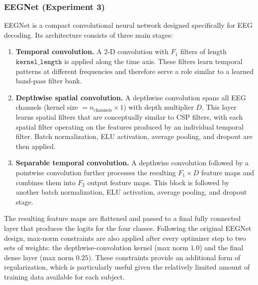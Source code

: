 \documentclass[11pt,a4paper]{article}
\begin{document}
\subsubsection{EEGNet (Experiment 3)}
\label{sec:eegnet}

EEGNet \cite{lawhern2018eegnet} is a compact convolutional neural network designed specifically for
EEG decoding. Its architecture consists of three main stages:

\begin{enumerate}[leftmargin=1.2cm]
	\item \textbf{Temporal convolution.}
	A 2-D convolution with $F_1$ filters of length $\texttt{kernel\_length}$ is applied along
	the time axis. These filters learn temporal patterns at different frequencies and therefore
	serve a role similar to a learned band-pass filter bank.
	
	\item \textbf{Depthwise spatial convolution.}
	A depthwise convolution spans all EEG channels (kernel size
	$= n_{\text{channels}} \times 1$) with depth multiplier $D$. This layer learns spatial filters
	that are conceptually similar to CSP filters, with each spatial filter operating on the
	features produced by an individual temporal filter. Batch normalization, ELU activation,
	average pooling, and dropout are then applied.
	
	\item \textbf{Separable temporal convolution.}
	A depthwise convolution followed by a pointwise convolution further processes the resulting
	$F_1{\times}D$ feature maps and combines them into $F_2$ output feature maps. This block is
	followed by another batch normalization, ELU activation, average pooling, and dropout stage.
\end{enumerate}

The resulting feature maps are flattened and passed to a final fully connected layer that produces
the logits for the four classes. Following the original EEGNet design, max-norm constraints are
also applied after every optimizer step to two sets of weights: the depthwise-convolution kernel
(max norm $1.0$) and the final dense layer (max norm $0.25$). These constraints provide an additional
form of regularization, which is particularly useful given the relatively limited amount of training
data available for each subject.
\end{document}
